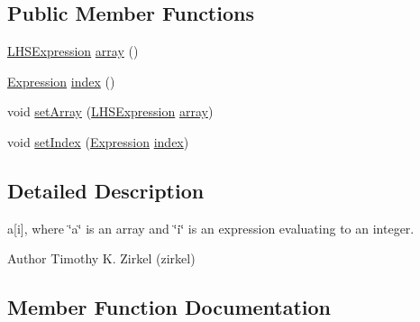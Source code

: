 \subsection*{Public Member Functions}
\begin{DoxyCompactItemize}
\item 
\hyperlink{interfaceedu_1_1udel_1_1cis_1_1vsl_1_1civl_1_1model_1_1IF_1_1expression_1_1LHSExpression}{L\+H\+S\+Expression} \hyperlink{interfaceedu_1_1udel_1_1cis_1_1vsl_1_1civl_1_1model_1_1IF_1_1expression_1_1SubscriptExpression_a488a31c75b0ed8c3f7fed148b182d50b}{array} ()
\item 
\hyperlink{interfaceedu_1_1udel_1_1cis_1_1vsl_1_1civl_1_1model_1_1IF_1_1expression_1_1Expression}{Expression} \hyperlink{interfaceedu_1_1udel_1_1cis_1_1vsl_1_1civl_1_1model_1_1IF_1_1expression_1_1SubscriptExpression_aba63ca614ab3facf273fb9df02cc4f7f}{index} ()
\item 
void \hyperlink{interfaceedu_1_1udel_1_1cis_1_1vsl_1_1civl_1_1model_1_1IF_1_1expression_1_1SubscriptExpression_aa3a59c81c1257df651f9b71ecf73a852}{set\+Array} (\hyperlink{interfaceedu_1_1udel_1_1cis_1_1vsl_1_1civl_1_1model_1_1IF_1_1expression_1_1LHSExpression}{L\+H\+S\+Expression} \hyperlink{interfaceedu_1_1udel_1_1cis_1_1vsl_1_1civl_1_1model_1_1IF_1_1expression_1_1SubscriptExpression_a488a31c75b0ed8c3f7fed148b182d50b}{array})
\item 
void \hyperlink{interfaceedu_1_1udel_1_1cis_1_1vsl_1_1civl_1_1model_1_1IF_1_1expression_1_1SubscriptExpression_af70b1d34abdfb8a09452766ef739a841}{set\+Index} (\hyperlink{interfaceedu_1_1udel_1_1cis_1_1vsl_1_1civl_1_1model_1_1IF_1_1expression_1_1Expression}{Expression} \hyperlink{interfaceedu_1_1udel_1_1cis_1_1vsl_1_1civl_1_1model_1_1IF_1_1expression_1_1SubscriptExpression_aba63ca614ab3facf273fb9df02cc4f7f}{index})
\end{DoxyCompactItemize}


\subsection{Detailed Description}
a\mbox{[}i\mbox{]}, where \char`\"{}a\char`\"{} is an array and \char`\"{}i\char`\"{} is an expression evaluating to an integer. 

\begin{DoxyAuthor}{Author}
Timothy K. Zirkel (zirkel) 
\end{DoxyAuthor}


\subsection{Member Function Documentation}
\hypertarget{interfaceedu_1_1udel_1_1cis_1_1vsl_1_1civl_1_1model_1_1IF_1_1expression_1_1SubscriptExpression_a488a31c75b0ed8c3f7fed148b182d50b}{}
